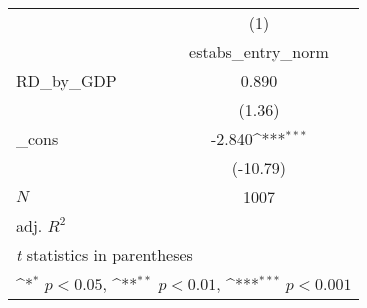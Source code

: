 {
\def\sym#1{\ifmmode^{#1}\else\(^{#1}\)\fi}
\begin{tabular}{l*{1}{c}}
\toprule
            &\multicolumn{1}{c}{(1)}\\
            &\multicolumn{1}{c}{estabs\_entry\_norm}\\
\midrule
RD\_by\_GDP   &       0.890         \\
            &      (1.36)         \\
\addlinespace
\_cons      &      -2.840\sym{***}\\
            &    (-10.79)         \\
\midrule
\(N\)       &        1007         \\
adj. \(R^{2}\)&                     \\
\bottomrule
\multicolumn{2}{l}{\footnotesize \textit{t} statistics in parentheses}\\
\multicolumn{2}{l}{\footnotesize \sym{*} \(p<0.05\), \sym{**} \(p<0.01\), \sym{***} \(p<0.001\)}\\
\end{tabular}
}

